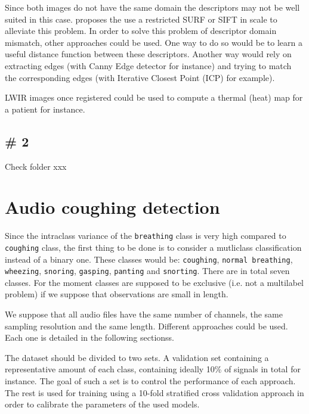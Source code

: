 \documentclass[10pt]{article}
\begin{document}
            Since both images do not have the same domain the descriptors may not be well suited in this case.
            \cite{huo2011multilevel} proposes the use a restricted SURF or SIFT in scale to alleviate this problem.
            In order to solve this problem of descriptor domain mismatch, other approaches could be used.
            One way to do so would be to learn a useful distance function between these descriptors.
            Another way would rely on extracting edges (with Canny Edge detector for instance) and trying to match the corresponding edges (with Iterative Closest Point (ICP) for example).

            LWIR images once registered could be used to compute a thermal (heat) map for a patient for instance.
        
        \subsection*{\# 2}
            Check folder xxx

    \section*{Audio coughing detection}
        Since the intraclass variance of the \texttt{breathing} class is very high compared to \texttt{coughing} class, the first thing to be done is to consider a mutliclass classification instead of a binary one.
        These classes would be: \texttt{coughing}, \texttt{normal breathing}, \texttt{wheezing}, \texttt{snoring}, \texttt{gasping}, \texttt{panting} and \texttt{snorting}.
        There are in total seven classes.
        For the moment classes are supposed to be exclusive (i.e. not a multilabel problem) if we suppose that observations are small in length.

        We suppose that all audio files have the same number of channels, the same sampling resolution and the same length.
        Different approaches could be used.
        Each one is detailed in the following sectionss.

        The dataset should be divided to two sets.
        A validation set containing a representative amount of each class, containing ideally 10\% of signals in total for instance.
        The goal of such a set is to control the performance of each approach.
        The rest is used for training using a 10-fold stratified cross validation approach in order to calibrate the parameters of the used models.
\end{document}
